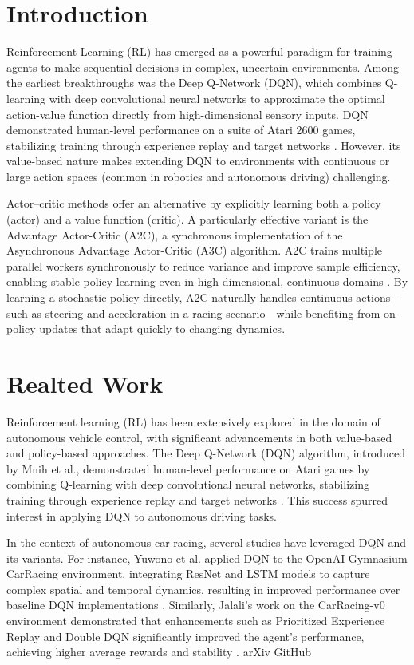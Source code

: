 \documentclass[conference]{IEEEtran}
\begin{document}
\section{Introduction}
Reinforcement Learning (RL) has emerged as a powerful paradigm for training agents to make sequential decisions in complex, uncertain environments. Among the earliest breakthroughs was the Deep Q-Network (DQN), which combines Q-learning with deep convolutional neural networks to approximate the optimal action-value function directly from high-dimensional sensory inputs. DQN demonstrated human-level performance on a suite of Atari 2600 games, stabilizing training through experience replay and target networks \cite{b1}. However, its value-based nature makes extending DQN to environments with continuous or large action spaces (common in robotics and autonomous driving) challenging. 

Actor–critic methods offer an alternative by explicitly learning both a policy (actor) and a value function (critic). A particularly effective variant is the Advantage Actor-Critic (A2C), a synchronous implementation of the Asynchronous Advantage Actor-Critic (A3C) algorithm. A2C trains multiple parallel workers synchronously to reduce variance and improve sample efficiency, enabling stable policy learning even in high-dimensional, continuous domains \cite{b2}. By learning a stochastic policy directly, A2C naturally handles continuous actions—such as steering and acceleration in a racing scenario—while benefiting from on-policy updates that adapt quickly to changing dynamics.

\section{Realted Work}

Reinforcement learning (RL) has been extensively explored in the domain of autonomous vehicle control, with significant advancements in both value-based and policy-based approaches. The Deep Q-Network (DQN) algorithm, introduced by Mnih et al., demonstrated human-level performance on Atari games by combining Q-learning with deep convolutional neural networks, stabilizing training through experience replay and target networks \cite{b1}. This success spurred interest in applying DQN to autonomous driving tasks.

In the context of autonomous car racing, several studies have leveraged DQN and its variants. For instance, Yuwono et al. applied DQN to the OpenAI Gymnasium CarRacing environment, integrating ResNet and LSTM models to capture complex spatial and temporal dynamics, resulting in improved performance over baseline DQN implementations \cite{b3}. Similarly, Jalali's work on the CarRacing-v0 environment demonstrated that enhancements such as Prioritized Experience Replay and Double DQN significantly improved the agent's performance, achieving higher average rewards and stability \cite{b4}.
arXiv
GitHub
\end{document}
